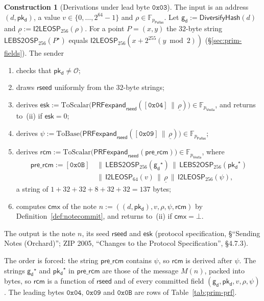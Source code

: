 \documentclass[11pt,a4paper]{article}
\theoremstyle{definition}
\newtheorem{construction}[theorem]{Construction}
\newcommand{\F}{\mathbb{F}}
\newcommand{\cmx}{\mathsf{cmx}}
\newcommand{\Pallas}{\ensuremath{\mathsf{Pallas}}}
\newcommand{\Vesta}{\ensuremath{\mathsf{Vesta}}}
\newcommand{\pkd}{\ensuremath{\mathsf{pk_d}}}
\newcommand{\gd}{\ensuremath{\mathsf{g_d}}}
\newcommand{\rcm}{\ensuremath{\mathsf{rcm}}}
\begin{document}
\begin{construction}[Derivations under lead byte $\mathtt{0x03}$]
The input is an address $(d, \pkd)$, a value $v \in \{0, \dots, 2^{64} - 1\}$
and $\rho \in \F_{p_{\Pallas}}$. Let $\gd := \mathsf{DiversifyHash}(d)$ and
$\underline{\rho} := \mathsf{I2LEOSP}_{256}(\rho)$. For a point $P = (x, y)$
the $32$-byte string $\mathsf{LEBS2OSP}_{256}(P^{\star})$ equals
$\mathsf{I2LEOSP}_{256}(x + 2^{255} (y \bmod 2))$ (\S\ref{sec:prim-fields}).
The sender
\begin{enumerate}[label=(\roman*)]
\item checks that $\pkd \neq \mathcal{O}$;
\item draws $\mathsf{rseed}$ uniformly from the $32$-byte strings;
\item derives
  $\mathsf{esk} := \mathrm{ToScalar}\bigl(\mathsf{PRFexpand}_{\mathsf{rseed}}
  ([\mathtt{0x04}] \,\|\, \underline{\rho})\bigr) \in \F_{p_{\Vesta}}$,
  and returns to~(ii) if $\mathsf{esk} = 0$;
\item derives
  $\psi := \mathrm{ToBase}\bigl(\mathsf{PRFexpand}_{\mathsf{rseed}}
  ([\mathtt{0x09}] \,\|\, \underline{\rho})\bigr) \in \F_{p_{\Pallas}}$;
\item derives
  $\rcm := \mathrm{ToScalar}\bigl(\mathsf{PRFexpand}_{\mathsf{rseed}}
  (\mathsf{pre\_rcm})\bigr) \in \F_{p_{\Vesta}}$, where
  \begin{align*}
    \mathsf{pre\_rcm} := [\mathtt{0x0B}]
      &\,\|\, \mathsf{LEBS2OSP}_{256}(\gd^{\star})
      \,\|\, \mathsf{LEBS2OSP}_{256}(\pkd^{\star}) \\
      &\,\|\, \mathsf{I2LEOSP}_{64}(v) \,\|\, \underline{\rho}
      \,\|\, \mathsf{I2LEOSP}_{256}(\psi),
  \end{align*}
  a string of $1 + 32 + 32 + 8 + 32 + 32 = 137$ bytes;
\item computes $\cmx$ of the note $n := ((d, \pkd), v, \rho, \psi, \rcm)$ by
  Definition~\ref{def:notecommit}, and returns to~(ii) if $\cmx = \bot$.
\end{enumerate}
The output is the note $n$, its seed $\mathsf{rseed}$ and $\mathsf{esk}$
(protocol specification, \S``Sending Notes (Orchard)''; ZIP 2005,
``Changes to the Protocol Specification'', \S 4.7.3).
\end{construction}

The order is forced: the string $\mathsf{pre\_rcm}$ contains $\psi$, so
$\rcm$ is derived after $\psi$. The strings $\gd^{\star}$ and $\pkd^{\star}$ in
$\mathsf{pre\_rcm}$ are those of the message $M(n)$, packed into bytes, so
$\rcm$ is a function of $\mathsf{rseed}$ and of every committed field
$(\gd, \pkd, v, \rho, \psi)$. The leading bytes $\mathtt{0x04}$,
$\mathtt{0x09}$ and $\mathtt{0x0B}$ are rows of
Table~\ref{tab:prim-prf}.
\end{document}
